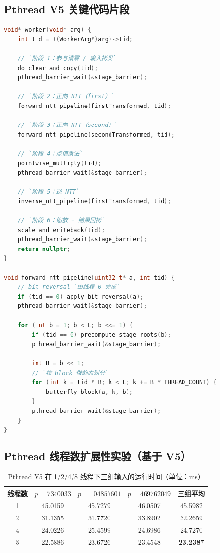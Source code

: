 \documentclass[UTF8,a4paper,10pt]{ctexart}
\begin{document}
\subsection{Pthread V5 关键代码片段}

\begin{lstlisting}[title=Pthread whole-pipeline 线程函数主体（简化）,frame=trbl,language={C++}]
void* worker(void* arg) {
    int tid = ((WorkerArg*)arg)->tid;

    // `阶段 1：参与清零 / 输入拷贝`
    do_clear_and_copy(tid);
    pthread_barrier_wait(&stage_barrier);

    // `阶段 2：正向 NTT（first）`
    forward_ntt_pipeline(firstTransformed, tid);

    // `阶段 3：正向 NTT（second）`
    forward_ntt_pipeline(secondTransformed, tid);

    // `阶段 4：点值乘法`
    pointwise_multiply(tid);
    pthread_barrier_wait(&stage_barrier);

    // `阶段 5：逆 NTT`
    inverse_ntt_pipeline(firstTransformed, tid);

    // `阶段 6：缩放 + 结果回拷`
    scale_and_writeback(tid);
    pthread_barrier_wait(&stage_barrier);
    return nullptr;
}

void forward_ntt_pipeline(uint32_t* a, int tid) {
    // bit-reversal `由线程 0 完成`
    if (tid == 0) apply_bit_reversal(a);
    pthread_barrier_wait(&stage_barrier);

    for (int b = 1; b < L; b <<= 1) {
        if (tid == 0) precompute_stage_roots(b);
        pthread_barrier_wait(&stage_barrier);

        int B = b << 1;
        // `按 block 做静态划分`
        for (int k = tid * B; k < L; k += B * THREAD_COUNT) {
            butterfly_block(a, k, b);
        }
        pthread_barrier_wait(&stage_barrier);
    }
}
\end{lstlisting}

\subsection{Pthread 线程数扩展性实验（基于 V5）}

\begin{table}[H]
  \centering
  \begin{tabular}{ccccc}
  \toprule  
  \textbf{线程数} & $p=7340033$ & $p=104857601$ & $p=469762049$ & \textbf{三组平均}\\
  \midrule
  1 & 45.0159 & 45.7279 & 46.0507 & 45.5982 \\
  2 & 31.1355 & 31.7720 & 33.8902 & 32.2659 \\
  4 & 24.0226 & 25.4599 & 24.6986 & 24.7270 \\
  8 & 22.5886 & 23.6726 & 23.4548 & \textbf{23.2387} \\
  \bottomrule
  \end{tabular}
  \caption{Pthread V5 在 1/2/4/8 线程下三组输入的运行时间（单位：ms）}
  \label{tab:pthread-scale}
\end{table}
\end{document}
